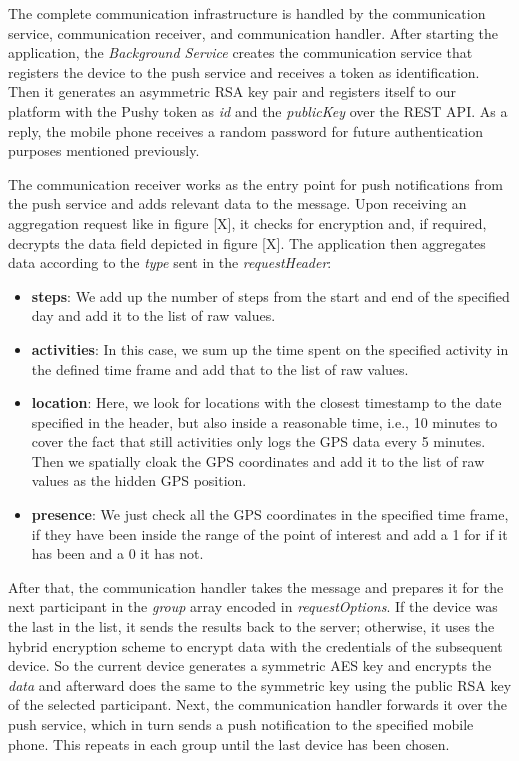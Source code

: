 The complete communication infrastructure is handled by the communication service, communication receiver, and communication handler. After starting the application, the \textit{Background Service} creates the communication service that registers the device to the push service and receives a token as identification. Then it generates an asymmetric RSA key pair and registers itself to our platform with the Pushy token as \textit{id} and the \textit{publicKey} over the REST API. As a reply, the mobile phone receives a random password for future authentication purposes mentioned previously.

The communication receiver works as the entry point for push notifications from the push service and adds relevant data to the message. Upon receiving an aggregation request like in figure [X], it checks for encryption and, if required, decrypts the data field depicted in figure [X]. The application then aggregates data according to the \textit{type} sent in the \textit{requestHeader}:
\begin{itemize}
    \item \textbf{steps}: We add up the number of steps from the start and end of the specified day and add it to the list of raw values.
    \item \textbf{activities}: In this case, we sum up the time spent on the specified activity in the defined time frame and add that to the list of raw values.
    \item \textbf{location}: Here, we look for locations with the closest timestamp to the date specified in the header, but also inside a reasonable time, i.e., 10 minutes to cover the fact that still activities only logs the GPS data every 5 minutes. Then we spatially cloak the GPS coordinates and add it to the list of raw values as the hidden GPS position.
    \item \textbf{presence}: We just check all the GPS coordinates in the specified time frame, if they have been inside the range of the point of interest and add a 1 for if it has been and a 0 it has not.
\end{itemize}

After that, the communication handler takes the message and prepares it for the next participant in the \textit{group} array encoded in \textit{requestOptions}. If the device was the last in the list, it sends the results back to the server; otherwise, it uses the hybrid encryption scheme to encrypt data with the credentials of the subsequent device. So the current device generates a symmetric AES key and encrypts the \textit{data} and afterward does the same to the symmetric key using the public RSA key of the selected participant. Next, the communication handler forwards it over the push service, which in turn sends a push notification to the specified mobile phone. This repeats in each group until the last device has been chosen.

